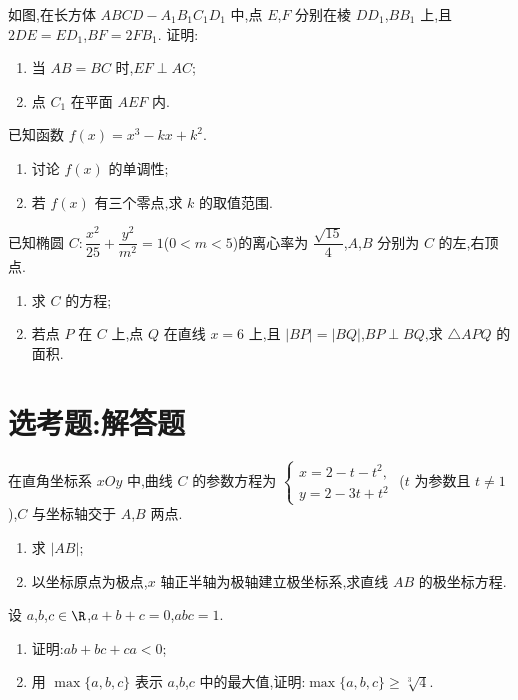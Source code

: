 \begin{problem}
如图,在长方体 \(ABCD-A_1B_1C_1D_1\) 中,点 \(E\),\(F\) 分别在棱 \(DD_1\),\(BB_1\) 上,且 \(2DE=ED_1\),\(BF=2FB_1\). 证明:

\begin{enumerate}
    \item 当 \(AB=BC\) 时,\(EF\perp AC\);
    \item 点 \(C_1\) 在平面 \(AEF\) 内.
\end{enumerate}

\end{problem}

\begin{problem}
已知函数 \(f(x)=x^3-kx+k^2\).

\begin{enumerate}
    \item 讨论 \(f(x)\) 的单调性;
    \item 若 \(f(x)\) 有三个零点,求 \(k\) 的取值范围.
\end{enumerate}
\end{problem}

\begin{problem}
已知椭圆 \(C:\dfrac{x^2}{25}+\dfrac{y^2}{m^2}=1\)(\(0<m<5\))的离心率为 \(\dfrac{\sqrt{15}}{4}\),\(A\),\(B\) 分别为 \(C\) 的左,右顶点.

\begin{enumerate}
    \item 求 \(C\) 的方程;
    \item 若点 \(P\) 在 \(C\) 上,点 \(Q\) 在直线 \(x=6\) 上,且 \(|BP|=|BQ|\),\(BP\perp BQ\),求 \(\triangle APQ\) 的面积.
\end{enumerate}
\end{problem}

\section{选考题:解答题}

\begin{problem}
在直角坐标系 \(xOy\) 中,曲线 \(C\) 的参数方程为
\(\begin{cases}
x=2-t-t^2,\\
y=2-3t+t^2
\end{cases}\)
(\(t\) 为参数且 \(t\neq 1\)),\(C\) 与坐标轴交于 \(A\),\(B\) 两点.

\begin{enumerate}
    \item 求 \(|AB|\);
    \item 以坐标原点为极点,\(x\) 轴正半轴为极轴建立极坐标系,求直线 \(AB\) 的极坐标方程.
\end{enumerate}
\end{problem}

\begin{problem}
设 \(a\),\(b\),\(c\in \R\),\(a+b+c=0\),\(abc=1\).

\begin{enumerate}
    \item 证明:\(ab+bc+ca<0\);
    \item 用 \(\max\{a,b,c\}\) 表示 \(a\),\(b\),\(c\) 中的最大值,证明:\(\max\{a,b,c\}\ge \sqrt[3]{4}\).
\end{enumerate}
\end{problem}

